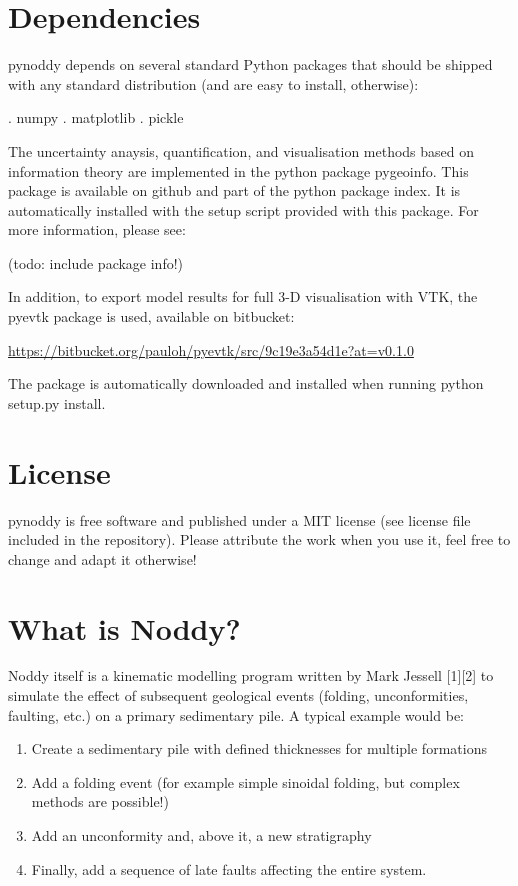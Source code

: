 \documentclass[a4paper,10pt,english]{sphinxmanual}
\begin{document}
\section{Dependencies}
\label{readme:dependencies}
pynoddy depends on several standard Python packages that should be
shipped with any standard distribution (and are easy to install,
otherwise):

. numpy . matplotlib . pickle

The uncertainty anaysis, quantification, and visualisation methods based
on information theory are implemented in the python package pygeoinfo.
This package is available on github and part of the python package
index. It is automatically installed with the setup script provided with
this package. For more information, please see:

(todo: include package info!)

In addition, to export model results for full 3-D visualisation with
VTK, the pyevtk package is used, available on bitbucket:

\href{https://bitbucket.org/pauloh/pyevtk/src/9c19e3a54d1e?at=v0.1.0}{https://bitbucket.org/pauloh/pyevtk/src/9c19e3a54d1e?at=v0.1.0}

The package is automatically downloaded and installed when running
python setup.py install.


\section{License}
\label{readme:license}
pynoddy is free software and published under a MIT license (see license
file included in the repository). Please attribute the work when you use
it, feel free to change and adapt it otherwise!


\section{What is Noddy?}
\label{readme:what-is-noddy}
Noddy itself is a kinematic modelling program written by Mark Jessell
{[}1{]}{[}2{]} to simulate the effect of subsequent geological events (folding,
unconformities, faulting, etc.) on a primary sedimentary pile. A typical
example would be:
\begin{enumerate}
\item {} 
Create a sedimentary pile with defined thicknesses for multiple
formations

\item {} 
Add a folding event (for example simple sinoidal folding, but complex
methods are possible!)

\item {} 
Add an unconformity and, above it, a new stratigraphy

\item {} 
Finally, add a sequence of late faults affecting the entire system.

\end{enumerate}
\end{document}
